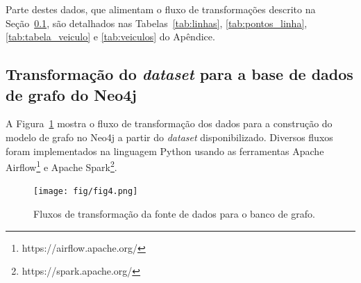 Parte destes dados, que alimentam o fluxo de transformações descrito na Seção~\ref{subsec:work}, são detalhados nas Tabelas~\ref{tab:linhas}, \ref{tab:pontos_linha}, \ref{tab:tabela_veiculo} e \ref{tab:veiculos} do Apêndice.








\subsection{Transformação do \emph{dataset} para a base de dados de grafo do Neo4j}
\label{subsec:work}

A Figura~\ref{fig:workflow} mostra o fluxo de transformação dos dados para a construção do modelo de grafo no Neo4j a partir do \emph{dataset} disponibilizado. Diversos fluxos foram implementados na linguagem Python usando as ferramentas Apache Airflow\footnote{https://airflow.apache.org/} e Apache Spark\footnote{https://spark.apache.org/}. 

\begin{figure}
\centering
\texttt{[image: fig/fig4.png]}
\caption{Fluxos de transformação da fonte de dados para o banco de grafo.}
\label{fig:workflow}
\end{figure}


